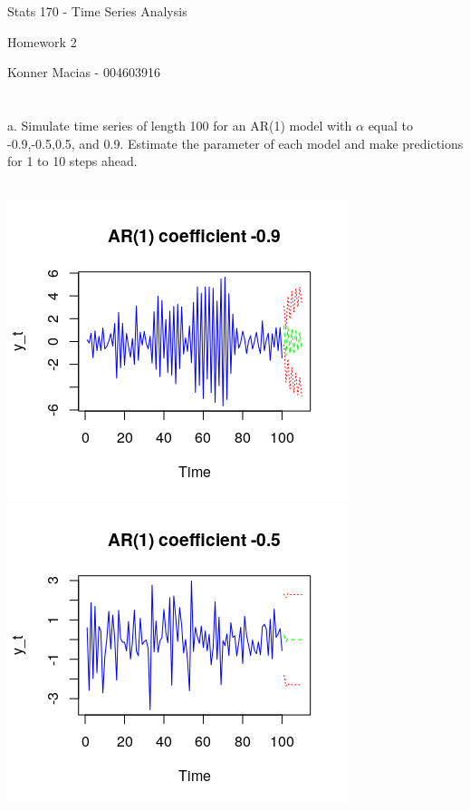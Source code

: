 \documentclass[11pt]{article}
\begin{document}
\centerline{\Large Stats 170 - Time Series Analysis}
\vspace{3pc}
\centerline{\Large Homework 2}
\vspace{.5pc}
\centerline{Konner Macias - 004603916}
\vspace{1.5pc}
\section{}
a. Simulate time series of length 100 for an AR(1) model with $\alpha$ equal to -0.9,-0.5,0.5, and 0.9. Estimate the parameter of each model and make predictions for 1 to 10 steps ahead.
\\\\
\begin{center}
\includegraphics[scale=1]{1a1}
\includegraphics[scale=1]{1a2}\\

\end{center}
\end{document}
